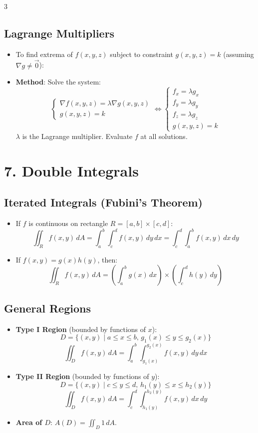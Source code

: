 \documentclass[10pt,landscape,a4paper]{article}
\begin{document}
\begin{multicols*}{3}
\subsection{Lagrange Multipliers}
\begin{itemize}
    \item To find extrema of $f(x,y,z)$ subject to constraint $g(x,y,z) = k$ (assuming $\nabla g \neq \vec{0}$):
    \item \textbf{Method}: Solve the system:
    \[ \begin{cases} \nabla f(x,y,z) = \lambda \nabla g(x,y,z) \\ g(x,y,z) = k \end{cases} \iff \begin{cases} f_x = \lambda g_x \\ f_y = \lambda g_y \\ f_z = \lambda g_z \\ g(x,y,z) = k \end{cases} \]
    $\lambda$ is the Lagrange multiplier. Evaluate $f$ at all solutions.
\end{itemize}

\section{7. Double Integrals}
\subsection{Iterated Integrals (Fubini's Theorem)}
\begin{itemize}
    \item If $f$ is continuous on rectangle $R = [a,b] \times [c,d]$:
    \[ \iint_R f(x,y)\,dA = \int_a^b \int_c^d f(x,y)\,dy\,dx = \int_c^d \int_a^b f(x,y)\,dx\,dy \]
    \item If $f(x,y) = g(x)h(y)$, then:
    \[ \iint_R f(x,y)\,dA = \left( \int_a^b g(x)\,dx \right) \times \left( \int_c^d h(y)\,dy \right) \]
\end{itemize}

\subsection{General Regions}
\begin{itemize}
    \item \textbf{Type I Region} (bounded by functions of $x$):
    \[ D = \{ (x,y) \mid a \leq x \leq b, \, g_1(x) \leq y \leq g_2(x) \} \]
    \[ \iint_D f(x,y)\,dA = \int_a^b \int_{g_1(x)}^{g_2(x)} f(x,y)\,dy\,dx \]
    \item \textbf{Type II Region} (bounded by functions of $y$):
    \[ D = \{ (x,y) \mid c \leq y \leq d, \, h_1(y) \leq x \leq h_2(y) \} \]
    \[ \iint_D f(x,y)\,dA = \int_c^d \int_{h_1(y)}^{h_2(y)} f(x,y)\,dx\,dy \]
    \item \textbf{Area of $D$}: $A(D) = \iint_D 1\,dA$.
\end{itemize}


\end{multicols*}
\end{document}
